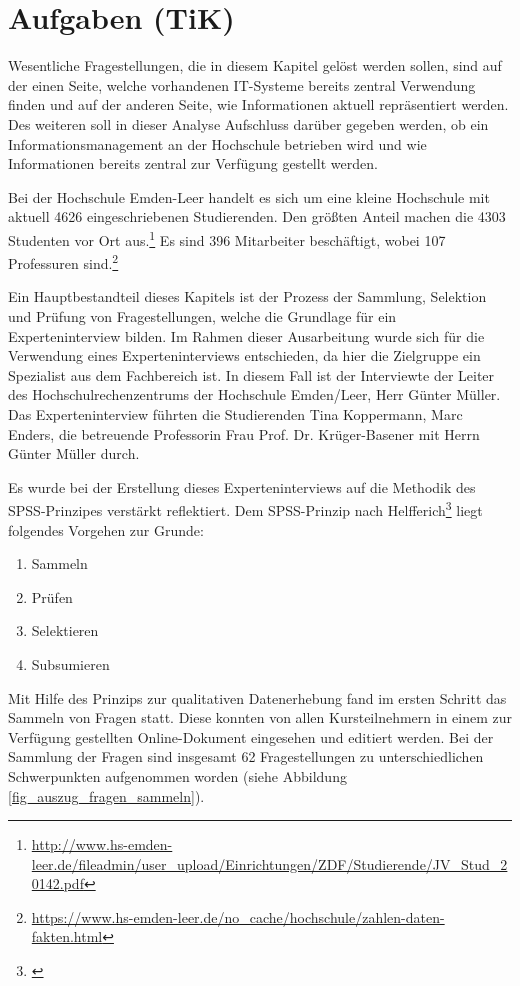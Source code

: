 \section{Aufgaben (TiK)}
Wesentliche Fragestellungen, die in diesem Kapitel gelöst werden sollen, sind auf der einen Seite, welche vorhandenen IT-Systeme bereits zentral Verwendung finden und auf der anderen Seite, wie Informationen aktuell repräsentiert werden. Des weiteren soll in dieser Analyse Aufschluss darüber gegeben werden, ob ein Informationsmanagement an der Hochschule betrieben wird und wie Informationen bereits zentral zur Verfügung gestellt werden.
  
Bei der Hochschule Emden-Leer handelt es sich um eine kleine Hochschule mit aktuell 4626 eingeschriebenen Studierenden. Den größten Anteil machen die 4303 Studenten vor Ort aus.\footnote{\url{http://www.hs-emden-leer.de/fileadmin/user_upload/Einrichtungen/ZDF/Studierende/JV_Stud_20142.pdf}} Es sind 396 Mitarbeiter beschäftigt, wobei 107 Professuren sind.\footnote{\url{https://www.hs-emden-leer.de/no_cache/hochschule/zahlen-daten-fakten.html}}

Ein Hauptbestandteil dieses Kapitels ist der Prozess der Sammlung, Selektion und Prüfung von Fragestellungen, welche die Grundlage für ein Experteninterview bilden. Im Rahmen dieser Ausarbeitung wurde sich für die Verwendung eines Experteninterviews entschieden, da hier die Zielgruppe ein Spezialist aus dem Fachbereich ist. In diesem Fall ist der Interviewte der Leiter des Hochschulrechenzentrums der Hochschule Emden/Leer, Herr Günter Müller. Das Experteninterview führten die Studierenden Tina Koppermann, Marc Enders, die betreuende Professorin Frau Prof. Dr. Krüger-Basener mit Herrn Günter Müller durch. 

Es wurde bei der Erstellung dieses Experteninterviews auf die Methodik des SPSS-Prinzipes verstärkt reflektiert. Dem SPSS-Prinzip nach Helfferich\footnote{\cite{helfferich_2009}} liegt folgendes Vorgehen zur Grunde:

\begin{enumerate}
	\item Sammeln
	\item Prüfen
	\item Selektieren
	\item Subsumieren		
\end{enumerate}

Mit Hilfe des Prinzips zur qualitativen Datenerhebung fand im ersten Schritt das Sammeln von Fragen statt. Diese konnten von allen Kursteilnehmern in einem zur Verfügung gestellten Online-Dokument eingesehen und editiert werden. Bei der Sammlung der Fragen sind insgesamt 62 Fragestellungen zu unterschiedlichen Schwerpunkten aufgenommen worden (siehe Abbildung \ref{fig_auszug_fragen_sammeln}).

